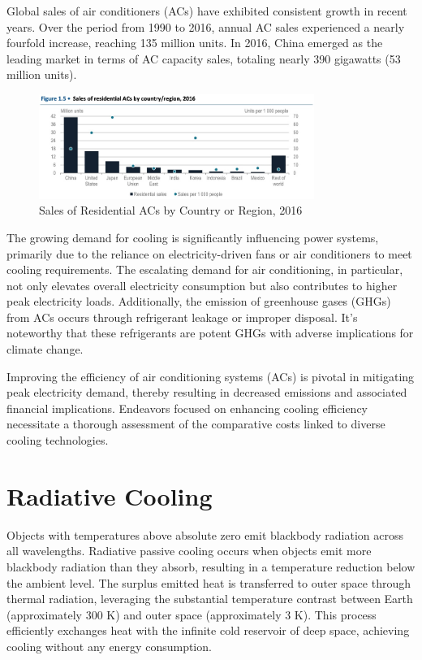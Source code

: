 Global sales of air conditioners (ACs) have exhibited consistent growth in recent years. Over the period from 1990 to 2016, annual AC sales experienced a nearly fourfold increase, reaching 135 million units. In 2016, China emerged as the leading market in terms of AC capacity sales, totaling nearly 390 gigawatts (53 million units). %

\begin{figure}
  \centering
  \includegraphics[width=0.8\textwidth]{Chapters/Figures/Sales of Residential ACs by Country or Region, 2016.jpg}
  \caption{Sales of Residential ACs by Country or Region, 2016}
\end{figure}

The growing demand for cooling is significantly influencing power systems, primarily due to the reliance on electricity-driven fans or air conditioners to meet cooling requirements. The escalating demand for air conditioning, in particular, not only elevates overall electricity consumption but also contributes to higher peak electricity loads. Additionally, the emission of greenhouse gases (GHGs) from ACs occurs through refrigerant leakage or improper disposal. It's noteworthy that these refrigerants are potent GHGs with adverse implications for climate change. %

Improving the efficiency of air conditioning systems (ACs) is pivotal in mitigating peak electricity demand, thereby resulting in decreased emissions and associated financial implications. Endeavors focused on enhancing cooling efficiency necessitate a thorough assessment of the comparative costs linked to diverse cooling technologies. %

\section{Radiative Cooling}
Objects with temperatures above absolute zero emit blackbody radiation across all wavelengths. Radiative passive cooling occurs when objects emit more blackbody radiation than they absorb, resulting in a temperature reduction below the ambient level. The surplus emitted heat is transferred to outer space through thermal radiation, leveraging the substantial temperature contrast between Earth (approximately 300 K) and outer space (approximately 3 K). This process efficiently exchanges heat with the infinite cold reservoir of deep space, achieving cooling without any energy consumption. %

